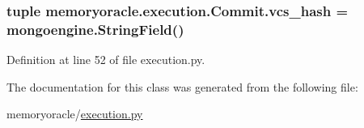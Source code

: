 \subsubsection[{vcs\+\_\+hash}]{\setlength{\rightskip}{0pt plus 5cm}tuple memoryoracle.\+execution.\+Commit.\+vcs\+\_\+hash = mongoengine.\+String\+Field()\hspace{0.3cm}{\ttfamily [static]}}\label{classmemoryoracle_1_1execution_1_1Commit_a3ba32127f9f96216379e06d3fb64fd9b}


Definition at line 52 of file execution.\+py.



The documentation for this class was generated from the following file\+:\begin{DoxyCompactItemize}
\item 
memoryoracle/\hyperlink{execution_8py}{execution.\+py}\end{DoxyCompactItemize}
